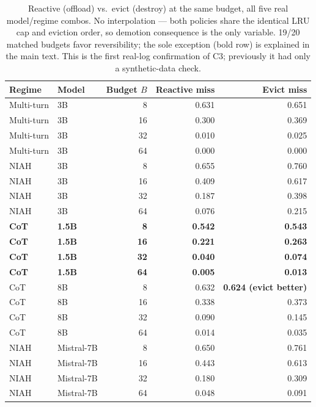 \documentclass[11pt]{article}
\begin{document}
\begin{table}[t]
\centering
\small
\begin{tabular}{llrrr}
\toprule
Regime & Model & Budget $B$ & Reactive miss & Evict miss \\
\midrule
Multi-turn & 3B & 8  & 0.631 & 0.651 \\
Multi-turn & 3B & 16 & 0.300 & 0.369 \\
Multi-turn & 3B & 32 & 0.010 & 0.025 \\
Multi-turn & 3B & 64 & 0.000 & 0.000 \\
\midrule
NIAH & 3B & 8  & 0.655 & 0.760 \\
NIAH & 3B & 16 & 0.409 & 0.617 \\
NIAH & 3B & 32 & 0.187 & 0.398 \\
NIAH & 3B & 64 & 0.076 & 0.215 \\
\midrule
\textbf{CoT} & \textbf{1.5B} & \textbf{8}  & \textbf{0.542} & \textbf{0.543} \\
\textbf{CoT} & \textbf{1.5B} & \textbf{16} & \textbf{0.221} & \textbf{0.263} \\
\textbf{CoT} & \textbf{1.5B} & \textbf{32} & \textbf{0.040} & \textbf{0.074} \\
\textbf{CoT} & \textbf{1.5B} & \textbf{64} & \textbf{0.005} & \textbf{0.013} \\
\midrule
CoT & 8B & 8  & 0.632 & \textbf{0.624 (evict better)} \\
CoT & 8B & 16 & 0.338 & 0.373 \\
CoT & 8B & 32 & 0.090 & 0.145 \\
CoT & 8B & 64 & 0.014 & 0.035 \\
\midrule
NIAH & Mistral-7B & 8  & 0.650 & 0.761 \\
NIAH & Mistral-7B & 16 & 0.443 & 0.613 \\
NIAH & Mistral-7B & 32 & 0.180 & 0.309 \\
NIAH & Mistral-7B & 64 & 0.048 & 0.091 \\
\bottomrule
\end{tabular}
\caption{Reactive (offload) vs.\ evict (destroy) at the same budget,
all five real model/regime combos. No interpolation --- both policies
share the identical LRU cap and eviction order, so demotion consequence
is the only variable. 19/20 matched budgets favor reversibility; the
sole exception (bold row) is explained in the main text. This is the
first real-log confirmation of C3; previously it had only a
synthetic-data check.}
\label{tab:evict}
\end{table}
\end{document}
